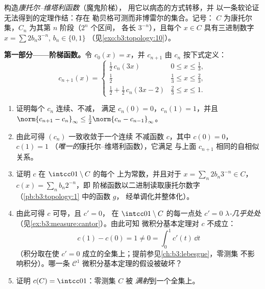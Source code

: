 \begin{problem}
\label{pb:b3:measure:1}
构造\emph{康托尔–维塔利函数}（魔鬼阶梯），
用它以病态的方式转移，并
以一条软论证无法得到的定理作结：存在
勒贝格可测而非博雷尔的集合。记号：
$C$ 为康托尔集，$C_n$ 为其第 $n$ 阶段（$2^n$ 个区间，
各长 $3^{-n}$），且每个 $x \in C$ 具有三进制数字
$x = \sum 2b_n3^{-n}$, $b_n \in \{0,1\}$
（见\cref{exo:b3:topology:10}）。

\medskip
\noindent\textbf{第一部分——阶梯函数。}令 $c_0(x) = x$，并
$c_{n+1}$ 由 $c_n$ 按下式定义：
\[
c_{n+1}(x) = \begin{cases}
\tfrac12\,c_n(3x) & 0 \leq x \leq \tfrac13,\\[2pt]
\tfrac12 & \tfrac13 \leq x \leq \tfrac23,\\[2pt]
\tfrac12 + \tfrac12\,c_n(3x - 2) & \tfrac23 \leq x \leq 1.
\end{cases}
\]
\begin{enumerate}
  \item 证明每个 $c_n$ 连续、不减，
        满足 $c_n(0) = 0$，$c_n(1) = 1$，并且
        $\norm{c_{n+1} - c_n}_\infty \leq
        \tfrac12\norm{c_n - c_{n-1}}_\infty$。
  \item 由此可得 $(c_n)$ 一致收敛于一个连续
        不减函数 $c$，其中 $c(0) = 0$，$c(1) = 1$
        （\emph{唯一的}康托尔–维塔利函数），它满足
        与上面 $c_{n+1}$ 相同的自相似关系。
  \item 证明 $c$ 在 $\intcc01\setminus C$ 的每个
        上为常数，并且对于 $x = \sum_n
        2b_n3^{-n} \in C$，$c(x) = \sum_n b_n2^{-n}$，即
        阶梯函数以二进制读取康托尔数字
        （\cref{pb:b3:topology:1} 中的函数 $g$，
        经单调化并整体化）。
  \item 由此可得 $c$ 可导，且 $c' = 0$，
        在 $\intcc01\setminus C$ 的每一点处 $c' = 0$
        \emph{$\lambda$-几乎处处}
        （见\cref{ex:b3:measure:cantor}）。由此可知
        微积分基本定理对 $c$ 不成立：
        \[
        c(1) - c(0) = 1 \neq 0 = \int_0^1 c'(t)\,\dd t
        \]
        （积分取在使
        $c' = 0$ 成立的全集上；提前参见\cref{ch:b3:lebesgue}，零测集
        不影响积分）。哪一条
        $\mathcal C^1$ 微积分基本定理的假设被破坏？
  \item 证明 $c(C) = \intcc01$：零测集 $C$ 被
        \emph{满射}到一个全集上。
\end{enumerate}


\end{problem}
